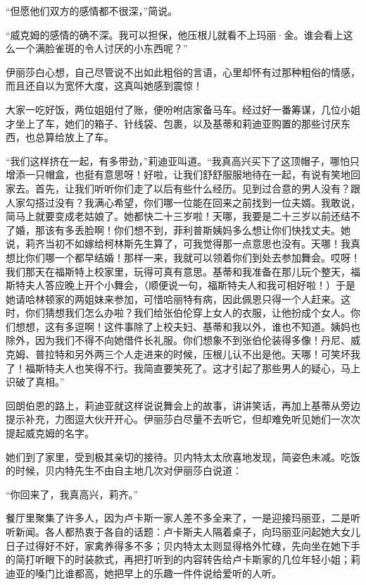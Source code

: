 \par “但愿他们双方的感情都不很深，”简说。
\par “威克姆的感情的确不深。我可以担保，他压根儿就看不上玛丽·金。谁会看上这么一个满脸雀斑的令人讨厌的小东西呢？”
\par 伊丽莎白心想，自己尽管说不出如此粗俗的言语，心里却怀有过那种粗俗的情感，而且还自以为宽怀大度，这真叫她感到震惊！
\par 大家一吃好饭，两位姐姐付了账，便吩咐店家备马车。经过好一番筹谋，几位小姐才坐上了车，她们的箱子、针线袋、包裹，以及基蒂和莉迪亚购置的那些讨厌东西，也总算给放上了车。
\par “我们这样挤在一起，有多带劲，”莉迪亚叫道。“我真高兴买下了这顶帽子，哪怕只增添一只帽盒，也挺有意思呀！好啦，让我们舒舒服服地待在一起，有说有笑地回家去。首先，让我们听听你们走了以后有些什么经历。见到过合意的男人没有？跟人家勾搭过没有？我满心希望，你们哪一位能在回来之前找到一位夫婿。我敢说，简马上就要变成老姑娘了。她都快二十三岁啦！天哪，我要是二十三岁以前还结不了婚，那该有多丢脸啊！你们想不到，菲利普斯姨妈多么想让你们快找丈夫。她说，莉齐当初不如嫁给柯林斯先生算了，可我觉得那一点意思也没有。天哪！我真想比你们哪一个都早结婚！那样一来，我就可以领着你们到处去参加舞会。哎呀！我们那天在福斯特上校家里，玩得可真有意思。基蒂和我准备在那儿玩个整天，福斯特夫人答应晚上开个小舞会，（顺便说一句，福斯特夫人和我可相好啦！）于是她请哈林顿家的两姐妹来参加，可惜哈丽特有病，因此佩恩只得一个人赶来。这时，你们猜想我们怎么办啦？我们给张伯伦穿上女人的衣服，让他扮成个女人。你们想想，这有多逗啊！这件事除了上校夫妇、基蒂和我以外，谁也不知道。姨妈也除外，因为我们不得不向她借件长礼服。你们想象不到张伯伦装得多像！丹尼、威克姆、普拉特和另外两三个人走进来的时候，压根儿认不出是他。天哪！可笑坏我了！福斯特夫人也笑得不行。我简直要笑死了。这才引起了那些男人的疑心，马上识破了真相。”
\par 回朗伯恩的路上，莉迪亚就这样说说舞会上的故事，讲讲笑话，再加上基蒂从旁边提示补充，力图逗大伙开开心。伊丽莎白尽量不去听它，但却难免听见她们一次次提起威克姆的名字。
\par 她们到了家里，受到极其亲切的接待。贝内特太太欣喜地发现，简姿色未减。吃饭的时候，贝内特先生不由自主地几次对伊丽莎白说道：
\par “你回来了，我真高兴，莉齐。”
\par 餐厅里聚集了许多人，因为卢卡斯一家人差不多全来了，一是迎接玛丽亚，二是听听新闻。各人都热衷于各自的话题：卢卡斯夫人隔着桌子，向玛丽亚问起她大女儿日子过得好不好，家禽养得多不多；贝内特太太则显得格外忙碌，先向坐在她下手的简打听眼下的时装款式，再把打听到的内容转告给卢卡斯家的几位年轻小姐；莉迪亚的嗓门比谁都高，她把早上的乐趣一件件说给爱听的人听。
